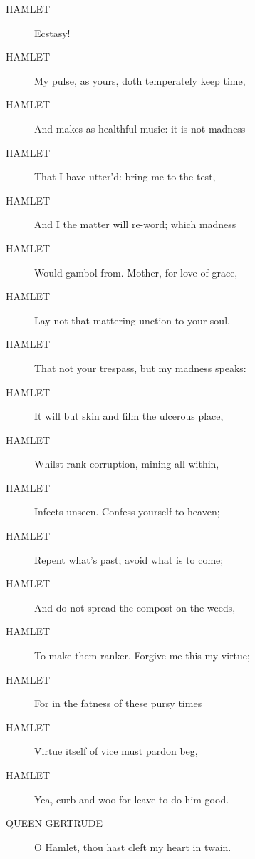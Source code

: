 \documentclass{article}
\begin{document}
\begin{description}
            
\item[HAMLET] Ecstasy!
\item[HAMLET] My pulse, as yours, doth temperately keep time,
\item[HAMLET] And makes as healthful music: it is not madness
\item[HAMLET] That I have utter'd: bring me to the test,
\item[HAMLET] And I the matter will re-word; which madness
\item[HAMLET] Would gambol from. Mother, for love of grace,
\item[HAMLET] Lay not that mattering unction to your soul,
\item[HAMLET] That not your trespass, but my madness speaks:
\item[HAMLET] It will but skin and film the ulcerous place,
\item[HAMLET] Whilst rank corruption, mining all within,
\item[HAMLET] Infects unseen. Confess yourself to heaven;
\item[HAMLET] Repent what's past; avoid what is to come;
\item[HAMLET] And do not spread the compost on the weeds,
\item[HAMLET] To make them ranker. Forgive me this my virtue;
\item[HAMLET] For in the fatness of these pursy times
\item[HAMLET] Virtue itself of vice must pardon beg,
\item[HAMLET] Yea, curb and woo for leave to do him good.
\end{description}
          
\begin{description}
            
\item[QUEEN GERTRUDE] O Hamlet, thou hast cleft my heart in twain.
\end{description}
          
\end{document}
